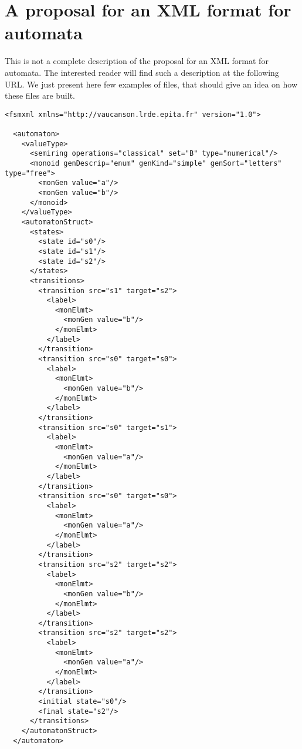 \chapter{A proposal for an XML format for automata}
\label{sec:xml}

This is not a complete description of the \Vauc proposal for an XML
format for automata.  The interested reader will find such a
description at the following URL.  We just present here few examples
of files, that should give an idea on how these files are built.

\begin{lstlisting}
<fsmxml xmlns="http://vaucanson.lrde.epita.fr" version="1.0">

  <automaton>
    <valueType>
      <semiring operations="classical" set="B" type="numerical"/>
      <monoid genDescrip="enum" genKind="simple" genSort="letters" type="free">
        <monGen value="a"/>
        <monGen value="b"/>
      </monoid>
    </valueType>
    <automatonStruct>
      <states>
        <state id="s0"/>
        <state id="s1"/>
        <state id="s2"/>
      </states>
      <transitions>
        <transition src="s1" target="s2">
          <label>
            <monElmt>
              <monGen value="b"/>
            </monElmt>
          </label>
        </transition>
        <transition src="s0" target="s0">
          <label>
            <monElmt>
              <monGen value="b"/>
            </monElmt>
          </label>
        </transition>
        <transition src="s0" target="s1">
          <label>
            <monElmt>
              <monGen value="a"/>
            </monElmt>
          </label>
        </transition>
        <transition src="s0" target="s0">
          <label>
            <monElmt>
              <monGen value="a"/>
            </monElmt>
          </label>
        </transition>
        <transition src="s2" target="s2">
          <label>
            <monElmt>
              <monGen value="b"/>
            </monElmt>
          </label>
        </transition>
        <transition src="s2" target="s2">
          <label>
            <monElmt>
              <monGen value="a"/>
            </monElmt>
          </label>
        </transition>
        <initial state="s0"/>
        <final state="s2"/>
      </transitions>
    </automatonStruct>
  </automaton>

\end{lstlisting}

